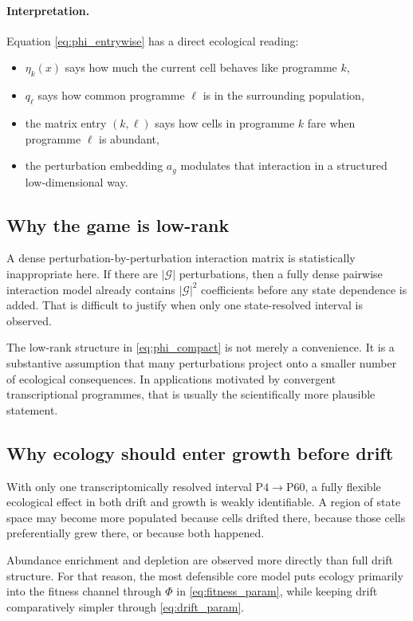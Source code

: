 \documentclass[11pt]{article}
\newcommand{\G}{\mathcal{G}}
\newcommand{\1}{\mathbf{1}}
\newcommand{\Pfour}{\mathrm{P4}}
\newcommand{\Psixty}{\mathrm{P60}}
\theoremstyle{plain}
\begin{document}
\paragraph{Interpretation.}
Equation \eqref{eq:phi_entrywise} has a direct ecological reading:
\begin{itemize}
    \item $\eta_k(x)$ says how much the current cell behaves like programme $k$,
    \item $q_\ell$ says how common programme $\ell$ is in the surrounding population,
    \item the matrix entry $(k,\ell)$ says how cells in programme $k$ fare when programme $\ell$ is abundant,
    \item the perturbation embedding $a_g$ modulates that interaction in a structured low-dimensional way.
\end{itemize}

\subsection{Why the game is low-rank}

A dense perturbation-by-perturbation interaction matrix is statistically inappropriate here. If there are $|\G|$ perturbations, then a fully dense pairwise interaction model already contains $|\G|^2$ coefficients before any state dependence is added. That is difficult to justify when only one state-resolved interval is observed.

The low-rank structure in \eqref{eq:phi_compact} is not merely a convenience. It is a substantive assumption that many perturbations project onto a smaller number of ecological consequences. In applications motivated by convergent transcriptional programmes, that is usually the scientifically more plausible statement.

\subsection{Why ecology should enter growth before drift}

With only one transcriptomically resolved interval $\Pfour\to\Psixty$, a fully flexible ecological effect in both drift and growth is weakly identifiable. A region of state space may become more populated because cells drifted there, because those cells preferentially grew there, or because both happened.

Abundance enrichment and depletion are observed more directly than full drift structure. For that reason, the most defensible core model puts ecology primarily into the fitness channel through $\Phi$ in \eqref{eq:fitness_param}, while keeping drift comparatively simpler through \eqref{eq:drift_param}.
\end{document}

